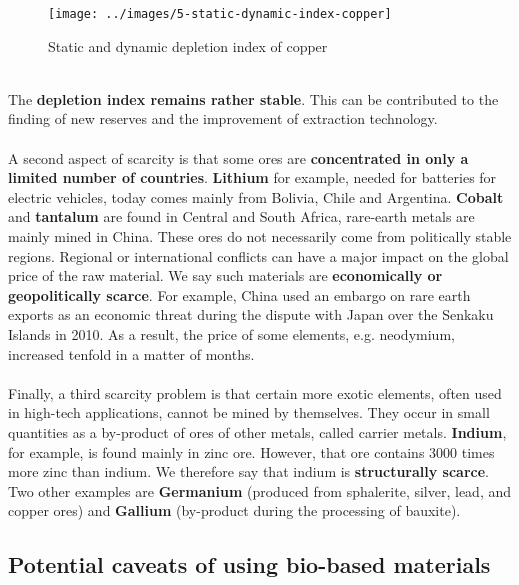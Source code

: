 \documentclass[../summary.tex]{subfiles}
\begin{document}
\begin{figure}[H]
	\centering
	\texttt{[image: ../images/5-static-dynamic-index-copper]}
	\caption{Static and dynamic depletion index of copper}
	\label{fig:static-dynamic-index-copper}
\end{figure}

\ \\
The \textbf{depletion index remains rather stable}. This can be contributed to the finding of new reserves and the improvement of extraction technology.
\\\\
A second aspect of scarcity is that some ores are \textbf{concentrated in only a limited number of countries}. \textbf{Lithium} for example, needed for batteries for electric vehicles, today comes mainly from Bolivia, Chile and Argentina. \textbf{Cobalt} and \textbf{tantalum} are found in Central and South Africa, rare-earth metals are mainly mined in China. These ores do not necessarily come from politically stable regions. Regional or international conflicts can have a major impact on the global price of the raw material. We say such materials are \textbf{economically or geopolitically scarce}. For example, China used an embargo on rare earth exports as an economic threat during the dispute with Japan over the Senkaku Islands in 2010. As a result, the price of some elements, e.g. neodymium, increased tenfold in a matter of months.
\\\\
Finally, a third scarcity problem is that certain more exotic elements, often used in high-tech applications, cannot be mined by themselves. They occur in small quantities as a by-product of ores of other metals, called carrier metals. \textbf{Indium}, for example, is found mainly in zinc ore. However, that ore contains 3000 times more zinc than indium. We therefore say that indium is \textbf{structurally scarce}. Two other examples are \textbf{Germanium} (produced from sphalerite, silver, lead, and copper ores) and \textbf{Gallium} (by-product during the processing of bauxite).
\newpage
\subsection{Potential caveats of using bio-based materials}
\end{document}
